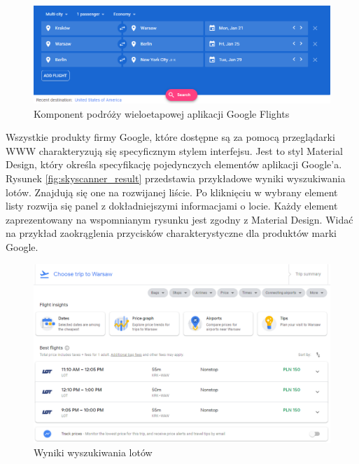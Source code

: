 \documentclass[12pt, twoside]{report}
\begin{document}
\begin{figure}[!ht]
\centering
\includegraphics[scale=0.60, keepaspectratio]{google_flights_multi.png}
\caption{Komponent podróży wieloetapowej aplikacji Google Flights}
\label{fig:google_flights_multi}
\end{figure}
Wszystkie produkty firmy Google, które dostępne są za pomocą przeglądarki WWW charakteryzują się specyficznym stylem interfejsu. Jest to styl Material Design, który określa specyfikację pojedynczych elementów aplikacji Google'a. Rysunek \ref{fig:skyscanner_result} przedstawia przykładowe wyniki wyszukiwania lotów. Znajdują się one na rozwijanej liście. Po kliknięciu w wybrany element listy rozwija się panel z dokładniejszymi informacjami o locie. Każdy element zaprezentowany na wspomnianym rysunku jest zgodny z Material Design. Widać na przykład zaokrąglenia przycisków charakterystyczne dla produktów marki Google. 

 
\begin{figure}[!ht]
\centering
\includegraphics[scale=0.50, keepaspectratio]{google_flights_result.png}
\caption{Wyniki wyszukiwania lotów}
\label{fig:google_flights_result}
\end{figure}
\end{document}
